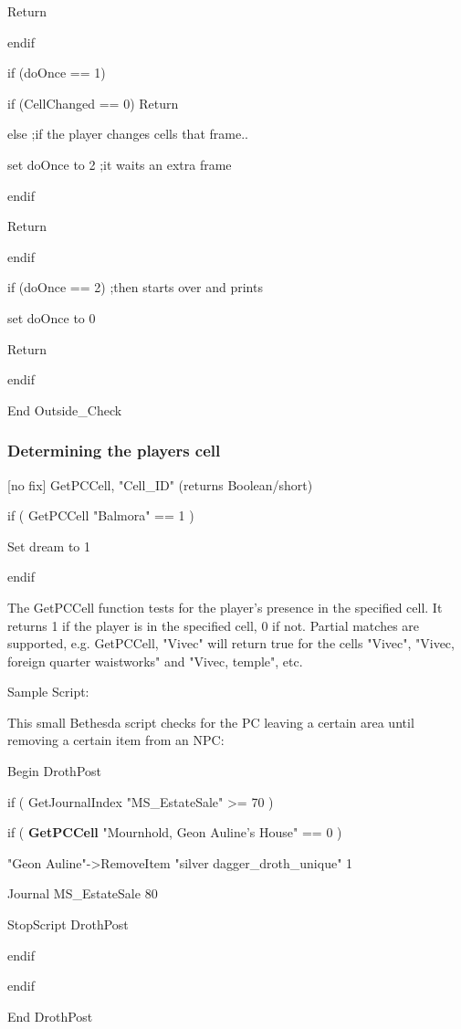 \documentclass[
]{article}
\begin{document}
Return

endif

if (doOnce == 1)

if (CellChanged == 0) Return

else ;if the player changes cells that frame..

set doOnce to 2 ;it waits an extra frame

endif

Return

endif

if (doOnce == 2) ;then starts over and prints

set doOnce to 0

Return

endif

End Outside\_Check

\hypertarget{determining-the-players-cell}{%
\subsubsection{Determining the players
cell}\label{determining-the-players-cell}}

{[}no fix{]} GetPCCell, "Cell\_ID" (returns Boolean/short)

if ( GetPCCell "Balmora" == 1 )

Set dream to 1

endif

The GetPCCell function tests for the player's presence in the specified
cell. It returns 1 if the player is in the specified cell, 0 if not.
Partial matches are supported, e.g. GetPCCell, "Vivec" will return true
for the cells "Vivec", "Vivec, foreign quarter waistworks" and "Vivec,
temple", etc.

Sample Script:

This small Bethesda script checks for the PC leaving a certain area
until removing a certain item from an NPC:

Begin DrothPost

if ( GetJournalIndex "MS\_EstateSale" \textgreater= 70 )

if ( \textbf{GetPCCell} "Mournhold, Geon Auline's House" == 0 )

"Geon Auline"-\textgreater RemoveItem "silver dagger\_droth\_unique" 1

Journal MS\_EstateSale 80

StopScript DrothPost

endif

endif

End DrothPost
\end{document}
